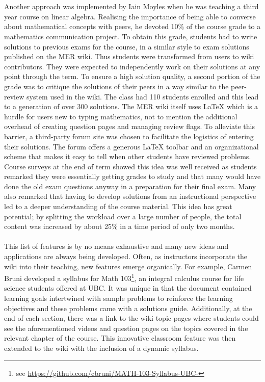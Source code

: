 \documentclass{primus}
\begin{document}
\\\\
\noindent{}Another approach was implemented by Iain Moyles when he was teaching a third year course on linear algebra. Realising the importance of being able to converse about mathematical concepts with peers, he devoted 10\% of the course grade to a mathematics communication project. To obtain this grade, students had to write solutions to previous exams for the course, in a similar style to exam solutions published on the MER wiki. Thus students were transformed from users to wiki contributors. They were expected to independently work on their solutions at any point through the term. To ensure a high solution quality, a second portion of the grade was to critique the solutions of their peers in a way similar to the peer-review system used in the wiki. The class had 110 students enrolled and this lead to a generation of over 300 solutions. The MER wiki itself uses LaTeX which is a hurdle for users new to typing mathematics, not to mention the additional overhead of creating question pages and managing review flags. To alleviate this barrier, a third-party forum site was chosen to facilitate the logistics of entering their solutions. The forum offers a generous LaTeX toolbar and an organizational scheme that makes it easy to tell when other students have reviewed problems. Course surveys at the end of term showed this idea was well received as students remarked they were essentially getting grades to study and that many would have done the old exam questions anyway in a preparation for their final exam. Many also remarked that having to develop solutions from an instructional perspective led to a deeper understanding of the course material. This idea has great potential; by splitting the workload over a large number of people, the total content was increased by about 25\% in a time period of only two months.
\\\\
\noindent{}This list of features is by no means exhaustive and many new ideas and applications are always being developed. Often, as instructors incorporate the wiki into their teaching, new features emerge organically. For example, Carmen Bruni developed a syllabus for Math 103\footnote{see \url{https://github.com/cbruni/MATH-103-Syllabus-UBC-}}, an integral calculus course for life science students offered at UBC. It was unique in that the document contained learning goals intertwined with sample problems to reinforce the learning objectives and these problems came with a solutions guide. Additionally, at the end of each section, there was a link to the wiki topic pages where students could see the aforementioned videos and question pages on the topics covered in the relevant chapter of the course. This innovative classroom feature was then extended to the wiki with the inclusion of a dynamic syllabus.
\end{document}
